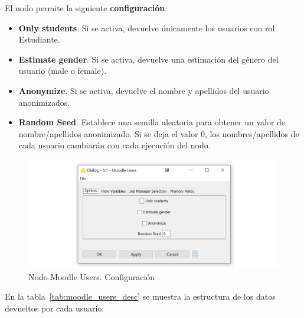 El nodo permite la siguiente \textbf{configuración}: 

\begin{itemize}
   \item \textbf{Only students}. Si se activa, devuelve únicamente los usuarios con rol Estudiante. 
   \item \textbf{Estimate gender}. Si se activa, devuelve una estimación del género del usuario (male o female). 
   \item \textbf{Anonymize}. Si se activa, devuelve el nombre y apellidos del usuario anonimizados.  
   \item \textbf{Random Seed}. Establece una semilla aleatoria para obtener un valor de nombre/apellidos anonimizado. 
   Si se deja el valor 0, los nombres/apellidos de cada usuario cambiarán con cada ejecución del nodo. 
\end{itemize}

\begin{figure}[!h]
	\centering
	\includegraphics[width=1\textwidth]{img/nodes_moodle_users_settings.png}
	\caption{Nodo Moodle Users. Configuración}
	\label{fig:moodleusers_settings}
\end{figure}
\FloatBarrier


En la tabla~\ref{tab:moodle_users_desc} se muestra la estructura de los datos devueltos por cada usuario: 


